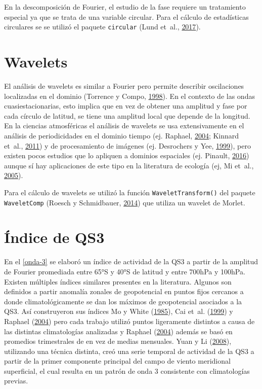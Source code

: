 \documentclass[spanish,a4paper,12pt,oneside]{book}
\begin{document}
En la descomposición de Fourier, el estudio de la fase requiere un
tratamiento especial ya que se trata de una variable circular. Para el
cálculo de estadísticas circulares se se utilizó el paquete
\texttt{circular} (Lund et~al.,
\protect\hyperlink{ref-R-circular}{2017}).

\section*{Wavelets}

El análisis de wavelets es similar a Fourier pero permite describir
oscilaciones localizadas en el dominio (Torrence y Compo,
\protect\hyperlink{ref-Torrence1998}{1998}). En el contexto de las ondas
cuasiestacionarias, esto implica que en vez de obtener una amplitud y
fase por cada círculo de latitud, se tiene una amplitud local que
depende de la longitud. En la ciencias atmosféricas el análisis de
wavelets se usa extensivamente en el análisis de periodicidades en el
dominio tiempo (ej. Raphael, \protect\hyperlink{ref-Raphael2004}{2004};
Kinnard et~al., \protect\hyperlink{ref-Kinnard2011}{2011}) y de
procesamiento de imágenes (ej. Desrochers y Yee,
\protect\hyperlink{ref-Desrochers1999}{1999}), pero existen pocos
estudios que lo apliquen a dominios espaciales (ej. Pinault,
\protect\hyperlink{ref-Pinault2016}{2016}) aunque sí hay aplicaciones de
este tipo en la literatura de ecología (ej, Mi et~al.,
\protect\hyperlink{ref-Mi2005}{2005}).

Para el cálculo de wavelets se utilizó la función
\texttt{WaveletTransform()} del paquete \texttt{WaveletComp} (Roesch y
Schmidbauer, \protect\hyperlink{ref-R-WaveletComp}{2014}) que utiliza un
wavelet de Morlet.

\section*{Índice de QS3}

En el \autoref{onda-3} se elaboró un índice de actividad de la QS3 a
partir de la amplitud de Fourier promediada entre 65°S y 40°S de latitud
y entre 700hPa y 100hPa. Existen múltiples índices similares presentes
en la literatura. Algunos son definidos a partir anomalía zonales de
geopotencial en puntos fijos cercanos a donde climatológicamente se dan
los máximos de geopotencial asociados a la QS3. Así construyeron sus
índices Mo y White (\protect\hyperlink{ref-Mo1985}{1985}), Cai et~al.
(\protect\hyperlink{ref-Cai1999}{1999}) y Raphael
(\protect\hyperlink{ref-Raphael2004}{2004}) pero cada trabajo utilizó
puntos ligeramente distintos a causa de las distintas climatologías
analizadas y Raphael (\protect\hyperlink{ref-Raphael2004}{2004}) además
se basó en promedios trimestrales de en vez de medias mensuales. Yuan y
Li (\protect\hyperlink{ref-Yuan2008}{2008}), utilizando una técnica
distinta, creó una serie temporal de actividad de la QS3 a partir de la
primer componente principal del campo de viento meridional superficial,
el cual resulta en un patrón de onda 3 consistente con climatologías
previas.
\end{document}
